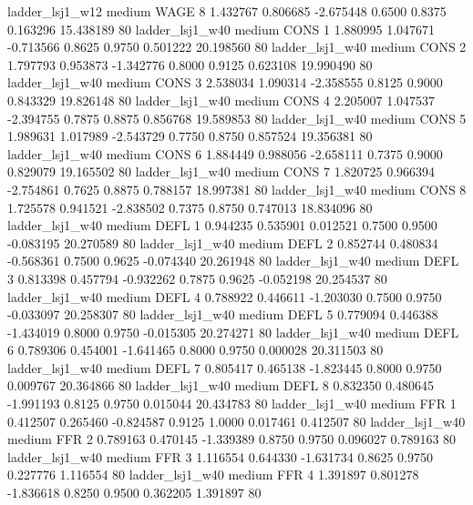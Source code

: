        ladder_lsj1_w12     medium     WAGE                 8  1.432767 0.806685 -2.675448 0.6500 0.8375  0.163296   15.438189 80
       ladder_lsj1_w40     medium     CONS                 1  1.880995 1.047671 -0.713566 0.8625 0.9750  0.501222   20.198560 80
       ladder_lsj1_w40     medium     CONS                 2  1.797793 0.953873 -1.342776 0.8000 0.9125  0.623108   19.990490 80
       ladder_lsj1_w40     medium     CONS                 3  2.538034 1.090314 -2.358555 0.8125 0.9000  0.843329   19.826148 80
       ladder_lsj1_w40     medium     CONS                 4  2.205007 1.047537 -2.394755 0.7875 0.8875  0.856768   19.589853 80
       ladder_lsj1_w40     medium     CONS                 5  1.989631 1.017989 -2.543729 0.7750 0.8750  0.857524   19.356381 80
       ladder_lsj1_w40     medium     CONS                 6  1.884449 0.988056 -2.658111 0.7375 0.9000  0.829079   19.165502 80
       ladder_lsj1_w40     medium     CONS                 7  1.820725 0.966394 -2.754861 0.7625 0.8875  0.788157   18.997381 80
       ladder_lsj1_w40     medium     CONS                 8  1.725578 0.941521 -2.838502 0.7375 0.8750  0.747013   18.834096 80
       ladder_lsj1_w40     medium     DEFL                 1  0.944235 0.535901  0.012521 0.7500 0.9500 -0.083195   20.270589 80
       ladder_lsj1_w40     medium     DEFL                 2  0.852744 0.480834 -0.568361 0.7500 0.9625 -0.074340   20.261948 80
       ladder_lsj1_w40     medium     DEFL                 3  0.813398 0.457794 -0.932262 0.7875 0.9625 -0.052198   20.254537 80
       ladder_lsj1_w40     medium     DEFL                 4  0.788922 0.446611 -1.203030 0.7500 0.9750 -0.033097   20.258307 80
       ladder_lsj1_w40     medium     DEFL                 5  0.779094 0.446388 -1.434019 0.8000 0.9750 -0.015305   20.274271 80
       ladder_lsj1_w40     medium     DEFL                 6  0.789306 0.454001 -1.641465 0.8000 0.9750  0.000028   20.311503 80
       ladder_lsj1_w40     medium     DEFL                 7  0.805417 0.465138 -1.823445 0.8000 0.9750  0.009767   20.364866 80
       ladder_lsj1_w40     medium     DEFL                 8  0.832350 0.480645 -1.991193 0.8125 0.9750  0.015044   20.434783 80
       ladder_lsj1_w40     medium      FFR                 1  0.412507 0.265460 -0.824587 0.9125 1.0000  0.017461    0.412507 80
       ladder_lsj1_w40     medium      FFR                 2  0.789163 0.470145 -1.339389 0.8750 0.9750  0.096027    0.789163 80
       ladder_lsj1_w40     medium      FFR                 3  1.116554 0.644330 -1.631734 0.8625 0.9750  0.227776    1.116554 80
       ladder_lsj1_w40     medium      FFR                 4  1.391897 0.801278 -1.836618 0.8250 0.9500  0.362205    1.391897 80
